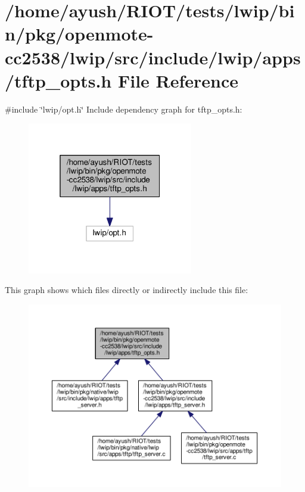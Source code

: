 \hypertarget{openmote-cc2538_2lwip_2src_2include_2lwip_2apps_2tftp__opts_8h}{}\section{/home/ayush/\+R\+I\+O\+T/tests/lwip/bin/pkg/openmote-\/cc2538/lwip/src/include/lwip/apps/tftp\+\_\+opts.h File Reference}
\label{openmote-cc2538_2lwip_2src_2include_2lwip_2apps_2tftp__opts_8h}
{\ttfamily \#include \char`\"{}lwip/opt.\+h\char`\"{}}\newline
Include dependency graph for tftp\+\_\+opts.\+h\+:
\nopagebreak
\begin{figure}[H]
\begin{center}
\leavevmode
\includegraphics[width=205pt]{openmote-cc2538_2lwip_2src_2include_2lwip_2apps_2tftp__opts_8h__incl}
\end{center}
\end{figure}
This graph shows which files directly or indirectly include this file\+:
\nopagebreak
\begin{figure}[H]
\begin{center}
\leavevmode
\includegraphics[width=350pt]{openmote-cc2538_2lwip_2src_2include_2lwip_2apps_2tftp__opts_8h__dep__incl}
\end{center}
\end{figure}
